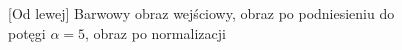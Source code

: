 \documentclass[a4paper,12pt, titlepage]{report}
\begin{document}
\FloatBarrier
\begin{figure}[h]
    \centering
    \caption{[Od lewej] Barwowy obraz wejściowy, obraz po podniesieniu do potęgi \(\alpha=5\), obraz po normalizacji}%
    \label{fig:geo_after_grey1}%
\end{figure}
\FloatBarrier
\end{document}
